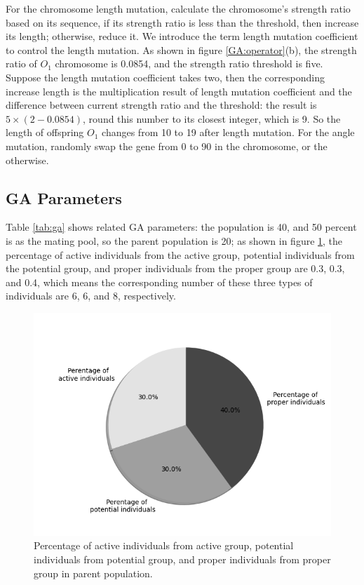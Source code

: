 For the chromosome length mutation, calculate the chromosome's strength ratio
based on its sequence, if its strength ratio is less than the threshold, then
increase its length; otherwise, reduce it. We introduce the term length
mutation coefficient to control the length mutation.  As shown in figure
\ref{GA:operator}(b), the strength ratio of $O_1$ chromosome is 0.0854, and the
strength ratio threshold is five. Suppose the length mutation coefficient takes
two, then the corresponding increase length is the multiplication result of
length mutation coefficient and the difference between current strength ratio
and the threshold: the result is $5\times(2-0.0854)$, round this number to its
closest integer, which is 9. So the length of offspring $O_1$ changes from 10
to 19 after length mutation.  For the angle mutation, randomly swap the gene
from 0 to 90 in the chromosome, or the otherwise.


\subsection{GA Parameters}
Table \ref{tab:ga} shows related GA parameters: the population is 40, and 50
percent is as the mating pool, so the parent population is 20; as
shown in figure \ref{fig:percentage}, the percentage of active individuals from
the active group, potential individuals from the potential group, and proper
individuals from the proper group are 0.3, 0.3, and 0.4, which means the
corresponding number of these three types of individuals are 6, 6, and 8,
respectively.

\begin{figure}[!htb]
	\centering
	\includegraphics[width=\linewidth]{fig/percentage_of_groups}
	\caption{Percentage of active individuals from active group, potential
	  individuals from potential group, and proper individuals from proper group
	 in parent population.}
	 \label{fig:percentage}
\end{figure}



